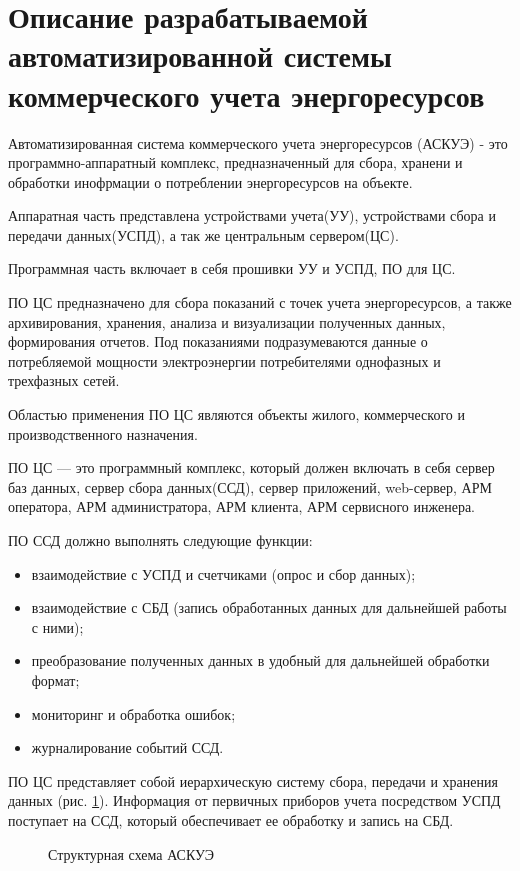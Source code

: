 \section{Описание разрабатываемой автоматизированной системы коммерческого учета энергоресурсов}

Автоматизированная система коммерческого учета энергоресурсов (АСКУЭ) - это программно-аппаратный комплекс, предназначенный для сбора, хранени и обработки инофрмации о потреблении энергоресурсов на объекте. 

Аппаратная часть представлена устройствами учета(УУ), устройствами сбора и передачи данных(УСПД), а так же центральным сервером(ЦС).

Программная часть включает в себя прошивки УУ и УСПД, ПО для ЦС.

ПО ЦС предназначено для сбора показаний с точек учета энергоресурсов, а также архивирования, хранения, анализа и визуализации полученных данных, формирования отчетов. Под показаниями подразумеваются данные о потребляемой мощности электроэнергии потребителями однофазных и трехфазных сетей.

Областью применения ПО ЦС являются объекты жилого, коммерческого и производственного назначения.

ПО ЦС — это программный комплекс, который должен включать в себя сервер баз данных, сервер сбора данных(ССД), сервер приложений, web-сервер, АРМ оператора, АРМ администратора, АРМ клиента, АРМ сервисного инженера.

ПО ССД должно выполнять следующие функции:
\begin{itemize}
 \item взаимодействие с УСПД и счетчиками (опрос и сбор данных);
 \item взаимодействие с СБД (запись обработанных данных для дальнейшей работы с ними);
 \item преобразование полученных данных в удобный для дальнейшей обработки формат;
 \item мониторинг и обработка ошибок;
 \item журналирование событий ССД.
\end{itemize}

ПО ЦС представляет собой иерархическую систему сбора, передачи и хранения данных (рис. \ref{irsh:irsh}). Информация от первичных приборов учета посредством УСПД поступает на ССД, который обеспечивает ее обработку и запись на СБД.

\begin{figure}[h!]
 \caption{Структурная схема АСКУЭ}
 \label{irsh:irsh}
\end{figure}
